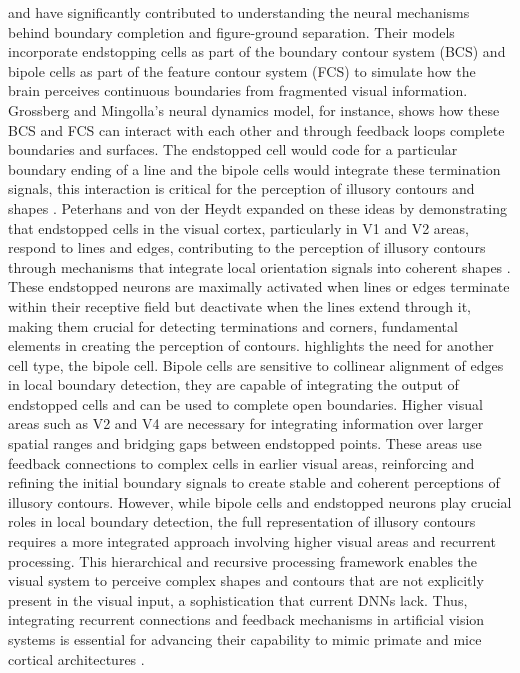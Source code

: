 \documentclass[12pt]{article}
\begin{document}
\textcite{grossbergVisualBrainVisual1997} and \textcite{vonderheydtMechanismsContourPerception1989} have significantly contributed to understanding the neural mechanisms behind boundary completion and figure-ground separation. Their models incorporate endstopping cells as part of the boundary contour system (BCS) and bipole cells as part of the feature contour system (FCS) to simulate how the brain perceives continuous boundaries from fragmented visual information. Grossberg and Mingolla's neural dynamics model, for instance, shows how these BCS and FCS can interact with each other and through feedback loops complete boundaries and surfaces. The endstopped cell would code for a particular boundary ending of a line and the bipole cells would integrate these termination signals, this interaction is critical for the perception of illusory contours and shapes \autocite{grossbergTextureSegregationSurface1998}. Peterhans and von der Heydt expanded on these ideas by demonstrating that endstopped cells in the visual cortex, particularly in V1 and V2 areas, respond to lines and edges, contributing to the perception of illusory contours through mechanisms that integrate local orientation signals into coherent shapes \autocite{grossbergTextureSegregationSurface1998}. These endstopped neurons are maximally activated when lines or edges terminate within their receptive field but deactivate when the lines extend through it, making them crucial for detecting terminations and corners, fundamental elements in creating the perception of contours. \textcite{grossbergFillingInFormsSurface2003} highlights the need for another cell type, the bipole cell. Bipole cells are sensitive to collinear alignment of edges in local boundary detection, they are capable of integrating the output of endstopped cells and can be used to complete open boundaries. Higher visual areas such as V2 and V4 are necessary for integrating information over larger spatial ranges and bridging gaps between endstopped points. These areas use feedback connections to complex cells in earlier visual areas, reinforcing and refining the initial boundary signals to create stable and coherent perceptions of illusory contours. However, while bipole cells and endstopped neurons play crucial roles in local boundary detection, the full representation of illusory contours requires a more integrated approach involving higher visual areas and recurrent processing. This hierarchical and recursive processing framework enables the visual system to perceive complex shapes and contours that are not explicitly present in the visual input, a sophistication that current DNNs lack. Thus, integrating recurrent connections and feedback mechanisms in artificial vision systems is essential for advancing their capability to mimic primate and mice cortical architectures \autocite{grossbergHowVisualIllusions2014,grossbergTextureSegregationSurface1998}. 
\end{document}
